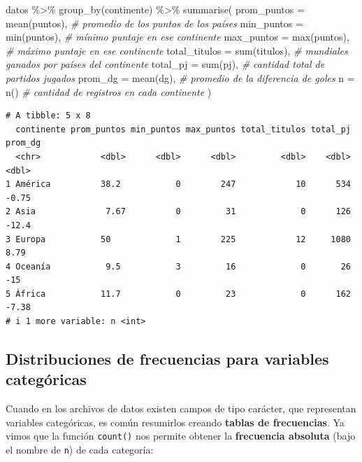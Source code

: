 \documentclass[
]{book}
\newenvironment{Shaded}{\begin{snugshade}}{\end{snugshade}}
\newcommand{\AttributeTok}[1]{\textcolor[rgb]{0.77,0.63,0.00}{#1}}
\newcommand{\CommentTok}[1]{\textcolor[rgb]{0.56,0.35,0.01}{\textit{#1}}}
\newcommand{\FunctionTok}[1]{\textcolor[rgb]{0.00,0.00,0.00}{#1}}
\newcommand{\NormalTok}[1]{#1}
\newcommand{\SpecialCharTok}[1]{\textcolor[rgb]{0.00,0.00,0.00}{#1}}
\begin{document}
\begin{Shaded}
\begin{Highlighting}[]
\NormalTok{datos }\SpecialCharTok{\%\textgreater{}\%} 
    \FunctionTok{group\_by}\NormalTok{(continente) }\SpecialCharTok{\%\textgreater{}\%} 
    \FunctionTok{summarise}\NormalTok{(}
        \AttributeTok{prom\_puntos =} \FunctionTok{mean}\NormalTok{(puntos),      }\CommentTok{\# promedio de los puntos de los países}
        \AttributeTok{min\_puntos =} \FunctionTok{min}\NormalTok{(puntos),        }\CommentTok{\# mínimo puntaje en ese continente}
        \AttributeTok{max\_puntos =} \FunctionTok{max}\NormalTok{(puntos),        }\CommentTok{\# máximo puntaje en ese continente}
        \AttributeTok{total\_titulos =} \FunctionTok{sum}\NormalTok{(titulos),    }\CommentTok{\# mundiales ganados por países del continente}
        \AttributeTok{total\_pj =} \FunctionTok{sum}\NormalTok{(pj),              }\CommentTok{\# cantidad total de partidos jugados}
        \AttributeTok{prom\_dg =} \FunctionTok{mean}\NormalTok{(dg),              }\CommentTok{\# promedio de la diferencia de goles}
        \AttributeTok{n =} \FunctionTok{n}\NormalTok{()                          }\CommentTok{\# cantidad de registros en cada continente}
\NormalTok{    ) }
\end{Highlighting}
\end{Shaded}

\begin{verbatim}
# A tibble: 5 x 8
  continente prom_puntos min_puntos max_puntos total_titulos total_pj prom_dg
  <chr>            <dbl>      <dbl>      <dbl>         <dbl>    <dbl>   <dbl>
1 América          38.2           0        247            10      534   -0.75
2 Asia              7.67          0         31             0      126  -12.4 
3 Europa           50             1        225            12     1080    8.79
4 Oceanía           9.5           3         16             0       26  -15   
5 África           11.7           0         23             0      162   -7.38
# i 1 more variable: n <int>
\end{verbatim}

\hypertarget{distribuciones-de-frecuencias-para-variables-categuxf3ricas}{%
\subsection{Distribuciones de frecuencias para variables categóricas}\label{distribuciones-de-frecuencias-para-variables-categuxf3ricas}}

Cuando en los archivos de datos existen campos de tipo carácter, que representan variables categóricas, es común resumirlos creando \textbf{tablas de frecuencias}. Ya vimos que la función \texttt{count()} nos permite obtener la \textbf{frecuencia absoluta} (bajo el nombre de \texttt{n}) de cada categoría:
\end{document}

